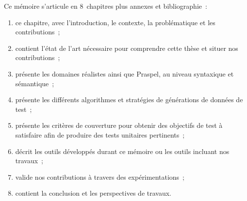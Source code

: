 Ce mémoire s'articule en 8~chapitres plus annexes et bibliographie~:
%
\begin{enumerate}

\item ce chapitre, avec l'introduction, le contexte, la problématique et les
contributions~;

\item contient l'état de l'art nécessaire pour comprendre cette thèse et situer
nos contributions~;

\item présente les domaines réalistes ainsi que Praspel, au niveau syntaxique et
sémantique~;

\item présente les différents algorithmes et stratégies de générations de
données de test~;

\item présente les critères de couverture pour obtenir des objectifs de test à
satisfaire afin de produire des tests unitaires pertinents~;

\item décrit les outils développés durant ce mémoire ou les outils incluant nos
travaux~;

\item valide nos contributions à travers des expérimentations~;

\item contient la conclusion et les perspectives de travaux.

\end{enumerate}
